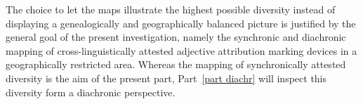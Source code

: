 The choice to let the maps illustrate the highest possible diversity instead of displaying a genealogically and geographically balanced picture is justified by the general goal of the present investigation, namely the synchronic and diachronic mapping of cross-linguistically attested adjective attribution marking devices in a geographically restricted area. Whereas the mapping of synchronically attested diversity is the aim of the present part, Part~\ref{part diachr} will inspect this diversity form a diachronic perspective.
